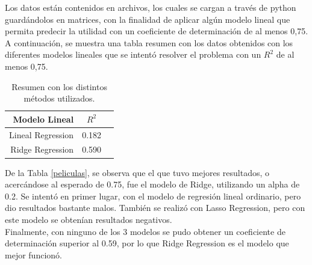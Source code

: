 \documentclass[letter, 10pt]{article}
\begin{document}
Los datos están contenidos en archivos, los cuales se cargan a través de python guardándolos en matrices, con la finalidad de aplicar algún modelo lineal que permita predecir la utilidad con un coeficiente de determinación de al menos 0,75.\\

A continuación, se muestra una tabla resumen con los datos obtenidos con los diferentes modelos lineales que se intentó resolver el problema con un $R^2$ de al menos 0,75.

\begin{table}[!hbt] 
\begin{center}
\begin{tabular}{| r | c | c |} 
\hline
\textbf{Modelo Lineal} & \textbf{$R^2$}\\ 
\hline 
Lineal Regression & 0.182\\ 
Ridge Regression & 0.590\\
\hline 
\end{tabular}
\caption{Resumen con los distintos métodos utilizados.} 
\label{table:peliculas}
\end{center} 
\end{table}

De la Tabla \ref{peliculas}, se observa que el que tuvo mejores resultados, o acercándose al esperado de 0.75, fue el modelo de Ridge, utilizando un alpha de 0.2. Se intentó en primer lugar, con el modelo de regresión lineal ordinario, pero dio resultados bastante malos. También se realizó con Lasso Regression, pero con este modelo se obtenían resultados negativos. \\

Finalmente, con ninguno de los 3 modelos se pudo obtener un coeficiente de determinación superior al 0.59, por lo que Ridge Regression es el modelo que mejor funcionó.



\end{document}
